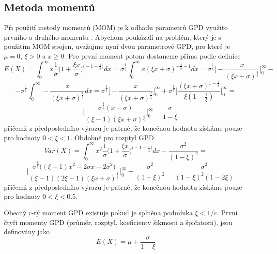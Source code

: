 \subsection{Metoda momentů}
Při použití metody momentů (MOM)  je k odhadu parametrů GPD využito prvního a druhého momentu \cite{mom_orig}. 
Abychom poukázali na problém, který je s použitím MOM spojen, uvažujme nyní dvou parametrové GPD, pro které je $\mu=0$, $\xi > 0$ a $x \geq 0$. 
Pro první moment potom dostaneme přímo podle definice
\begin{equation*}
E(X)=\int_{0}^{\infty}x\frac{1}{\sigma}\Bigg(1+\frac{\xi x}{\sigma}\Bigg)^{\Big(-1-\frac{1}{\xi}\Big)}dx=\sigma^{\frac{1}{\xi}}\int_{0}^{\infty}x(\xi x + \sigma)^{-\frac{1}{\xi}-1}dx=\sigma^{\frac{1}{\xi}}\Bigg[-\frac{x}{(\xi x + \sigma)^{\frac{1}{\xi}}}\Bigg]_0^{\infty}-
\end{equation*}
\begin{equation*}
-\sigma^{\frac{1}{\xi}}\int_{0}^{\infty}-\frac{x}{(\xi x + \sigma)^{\frac{1}{\xi}}} dx=\sigma^{\frac{1}{\xi}}\Bigg[-\frac{x}{(\xi x + \sigma)^{\frac{1}{\xi}}}\Bigg]_0^{\infty} + \sigma^{\frac{1}{\xi}}\Bigg[\frac{(\xi x + \sigma)^{1-\frac{1}{\xi}}}{\xi(1-\frac{1}{\xi})}\Bigg]_0^{\infty}=
\end{equation*}
\begin{equation}
=\Bigg[\frac{\sigma^{\frac{1}{\xi}}(x+\sigma)}{(\xi-1)(\xi x+\sigma)^{\frac{1}{\xi}}}\Bigg]_0^{\infty}=\frac{\sigma}{1-\xi}
\end{equation}
přičemž z předposledního výrazu je patrné, že konečnou hodnotu získáme pouze pro hodnoty $0 < \xi < 1$. Obdobně pro rozptyl GPD 
\begin{equation*}
Var(X)=\int_{0}^{\infty}x^2 \frac{1}{\sigma}\Bigg(1+\frac{\xi x}{\sigma}\Bigg)^{\big(-1-\frac{1}{\xi}\big)}dx-\frac{\sigma^2}{(1-\xi)^2}=
\end{equation*}
\begin{equation}
=\Bigg[\frac{\sigma^{\frac{1}{\xi}}\big((\xi-1)x^2-2\sigma x-2\sigma^2\big)}{(\xi-1)(2\xi-1)(\xi x+\sigma)^{\frac{1}{\xi}}}  \Bigg]_0^{\infty}-\frac{\sigma^2}{(1-\xi)^2}=\frac{\sigma^2}{(1-\xi)^2(1-2\xi)}
\end{equation}
přičemž z předposledního výrazu je patrné, že konečnou hodnotu získáme pouze pro hodnoty $0 < \xi < 0.5$.
\par
Obecný $r$-tý moment GPD existuje pokud je splněna podmínka $\xi < 1/r$.
První čtyři momenty GPD (průměr, rozptyl, koeficienty šikmosti a špičatosti), jsou definovány jako
\begin{equation}\label{eq:mom1}
E(X)=\mu+\frac{\sigma}{1-\xi}
\end{equation}
